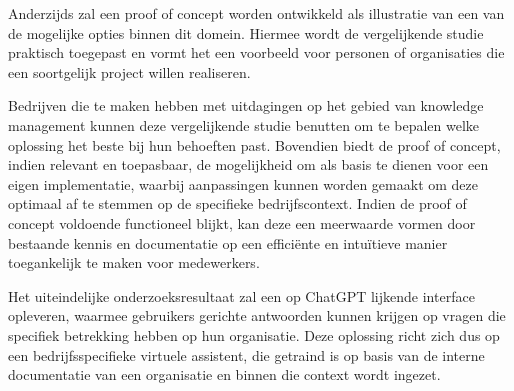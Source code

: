 Anderzijds zal een proof of concept worden ontwikkeld als illustratie van een van de mogelijke opties binnen dit domein. Hiermee wordt de vergelijkende studie praktisch toegepast en vormt het een voorbeeld voor personen of organisaties die een soortgelijk project willen realiseren.

Bedrijven die te maken hebben met uitdagingen op het gebied van knowledge management kunnen deze vergelijkende studie benutten om te bepalen welke oplossing het beste bij hun behoeften past. Bovendien biedt de proof of concept, indien relevant en toepasbaar, de mogelijkheid om als basis te dienen voor een eigen implementatie, waarbij aanpassingen kunnen worden gemaakt om deze optimaal af te stemmen op de specifieke bedrijfscontext. Indien de proof of concept voldoende functioneel blijkt, kan deze een meerwaarde vormen door bestaande kennis en documentatie op een efficiënte en intuïtieve manier toegankelijk te maken voor medewerkers.

Het uiteindelijke onderzoeksresultaat zal een op ChatGPT lijkende interface opleveren, waarmee gebruikers gerichte antwoorden kunnen krijgen op vragen die specifiek betrekking hebben op hun organisatie. Deze oplossing richt zich dus op een bedrijfsspecifieke virtuele assistent, die getraind is op basis van de interne documentatie van een organisatie en binnen die context wordt ingezet.



